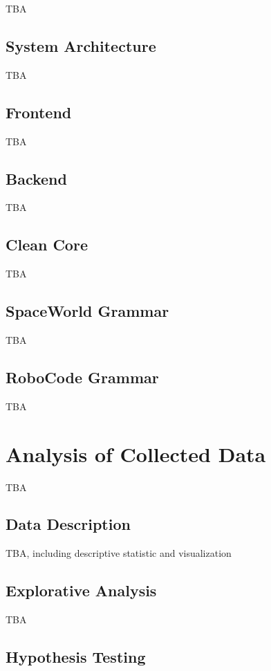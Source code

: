 \documentclass[
    digital,    %
    oneside,    %
    color,
    11pt,
    nocover,
    notable,
    nolof,
    nolot,
    final
]{fithesis3}
\begin{document}
TBA

\section{System Architecture}

TBA

\section{Frontend}

TBA


\section{Backend}

TBA

\section{Clean Core}

TBA


\section{SpaceWorld Grammar}

TBA


\section{RoboCode Grammar}

TBA


\chapter{Analysis of Collected Data}
\label{chap:analysis}

TBA

\section{Data Description}

TBA, including descriptive statistic and visualization


\section{Explorative Analysis}

TBA


\section{Hypothesis Testing}
\end{document}
